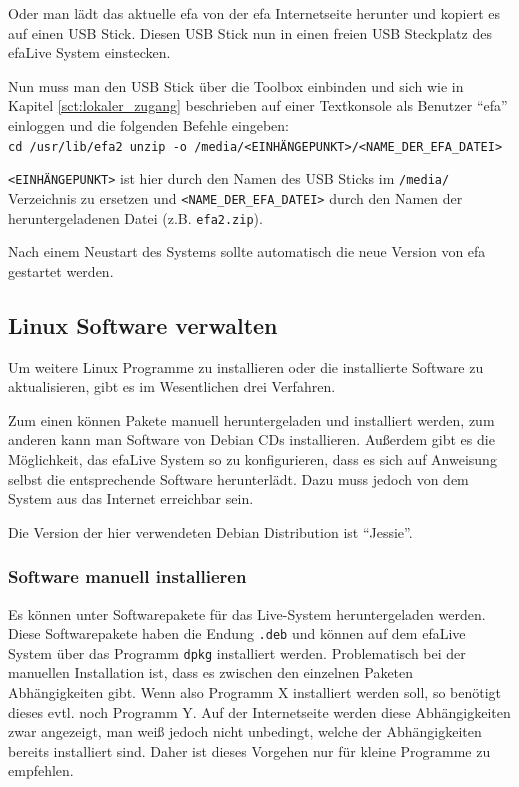\documentclass[a4paper,12pt,twoside]{article}
\begin{document}
Oder man lädt das aktuelle efa von der efa Internetseite \cite{EFA1}
herunter und kopiert es auf einen USB Stick. Diesen USB Stick nun in
einen freien USB Steckplatz des efaLive System einstecken. 

Nun muss man den USB Stick über die Toolbox einbinden und sich wie in
Kapitel \ref{sct:lokaler_zugang} beschrieben auf einer Textkonsole als Benutzer
"`efa"' einloggen und die folgenden Befehle eingeben:
\bigskip
\\
\texttt{cd /usr/lib/efa2
unzip -o /media/{\textless}EINHÄNGEPUNKT{\textgreater}/{\textless}NAME\_DER\_EFA\_DATEI{\textgreater}}

\bigskip
\texttt{{\textless}EINHÄNGEPUNKT{\textgreater}} ist hier durch den Namen des USB
Sticks im \texttt{/media/} Verzeichnis zu ersetzen und \texttt{{\textless}NAME\_DER\_EFA\_DATEI{\textgreater}} 
durch den Namen der heruntergeladenen Datei (z.B. \texttt{efa2.zip}).

Nach einem Neustart des Systems sollte automatisch die neue Version von
efa gestartet werden.


\subsection{Linux Software verwalten}
\label{sct:linux_software}
Um weitere Linux Programme zu installieren oder die installierte
Software zu aktualisieren, gibt es im Wesentlichen
drei Verfahren. 

Zum einen können Pakete manuell heruntergeladen und installiert werden,
zum anderen kann man Software von Debian CDs installieren. Außerdem
gibt es die Möglichkeit, das efaLive System so zu konfigurieren, dass
es sich auf Anweisung selbst die entsprechende Software herunterlädt.
Dazu muss jedoch von dem System aus das Internet erreichbar sein.

Die Version der hier verwendeten Debian Distribution ist "`Jessie"'.


\subsubsection{Software manuell installieren}
\label{sct:software_manuell}
Es können unter \cite{DEB3} Softwarepakete für das Live-System
heruntergeladen werden. Diese Softwarepakete haben die Endung
\texttt{.deb} und können auf dem efaLive System
über das Programm \texttt{dpkg} installiert werden. Problematisch bei der
manuellen Installation ist, dass es zwischen den einzelnen Paketen
Abhängigkeiten gibt. Wenn also Programm X installiert werden soll, so
benötigt dieses evtl. noch Programm Y. Auf der Internetseite werden
diese Abhängigkeiten zwar angezeigt, man weiß jedoch nicht unbedingt,
welche der Abhängigkeiten bereits installiert sind. Daher ist dieses
Vorgehen nur für kleine Programme zu empfehlen.
\end{document}
